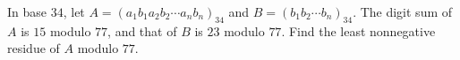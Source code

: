 In base $34$, let $A=(a_1b_1a_2b_2\cdots a_nb_n)_{34}$ and $B=(b_1b_2\cdots b_n)_{34}$. The digit sum of $A$ is $15$ modulo $77$, and that of $B$ is $23$ modulo $77$. Find the least nonnegative residue of $A$ modulo $77$.
